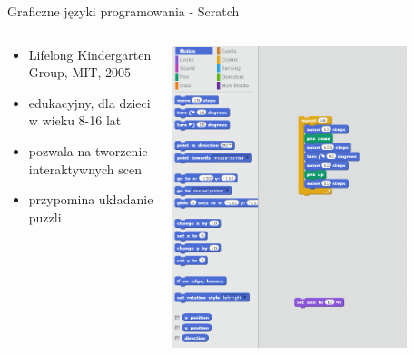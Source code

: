 \documentclass[presentation]{beamer}
\begin{document}
\begin{frame}[label=sec-1-3]{Graficzne języki programowania - Scratch}
\begin{columns}
\begin{column}{0.4\textwidth}
\begin{itemize}
\item Lifelong Kindergarten Group, MIT, 2005
\item edukacyjny, dla dzieci w wieku 8-16 lat
\item pozwala na tworzenie interaktywnych scen
\item przypomina układanie puzzli
\end{itemize}
\end{column}
\begin{column}{0.6\textwidth}
\includegraphics[width=0.8\textwidth]{./img/s-puzzle.png}
\end{column}
\end{columns}
\end{frame}
\end{document}
